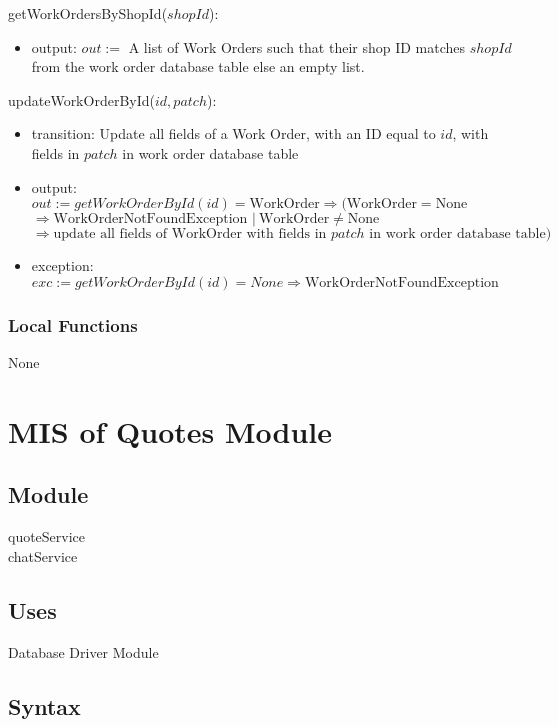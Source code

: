 \documentclass[12pt, titlepage]{article}
\begin{document}
\noindent getWorkOrdersByShopId($shopId$):
\begin{itemize}
	\item output: $out :=$ A list of Work Orders such that their shop ID matches $shopId$ from the work order
	      database table else an empty list.
\end{itemize}

\noindent updateWorkOrderById($id, patch$):
\begin{itemize}
	\item transition: Update all fields of a Work Order, with an ID equal to $id$, with fields in $patch$ in
	      work order database table
	\item output: $out := getWorkOrderById(id) = \text{WorkOrder} \Rightarrow (\text{WorkOrder} = \text{None}
		      $ \\ $\Rightarrow \text{WorkOrderNotFoundException } |\ \text{WorkOrder} \neq \text{None}$ \\
		      $\Rightarrow \text{update all fields of WorkOrder with fields in } patch \text{ in work order
			      database table})$
	\item exception: $exc := getWorkOrderById(id) = None \Rightarrow \text{WorkOrderNotFoundException}$
\end{itemize}

\subsubsection{Local Functions}

None

\newpage

\section{MIS of Quotes Module} \label{mQuotes}
\subsection{Module}

quoteService \\ chatService

\subsection{Uses}

Database Driver Module

\subsection{Syntax}
\end{document}
